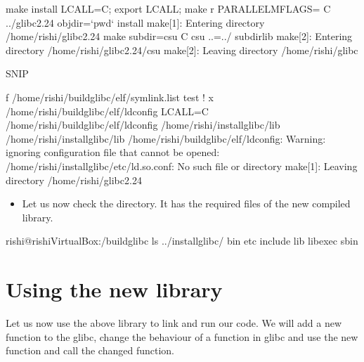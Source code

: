 \documentclass[letterpaper,10pt,english]{sphinxmanual}
\begin{document}
\begin{sphinxVerbatim}[commandchars=\\\{\}]
\PYGZdl{} make install
LC\PYGZus{}ALL=C; export LC\PYGZus{}ALL; \PYGZbs{}
make \PYGZhy{}r PARALLELMFLAGS=\PYGZdq{}\PYGZdq{} \PYGZhy{}C ../glibc\PYGZhy{}2.24 objdir={}`pwd{}` install
make[1]: Entering directory \PYGZsq{}/home/rishi/glibc\PYGZhy{}2.24\PYGZsq{}
make  subdir=csu \PYGZhy{}C csu ..=../ subdir\PYGZus{}lib
make[2]: Entering directory \PYGZsq{}/home/rishi/glibc\PYGZhy{}2.24/csu\PYGZsq{}
make[2]: Leaving directory \PYGZsq{}/home/rishi/glibc\PYGZhy{}

\PYGZgt{}\PYGZgt{}\PYGZgt{}\PYGZgt{}\PYGZgt{}\PYGZgt{}\PYGZgt{}\PYGZgt{}\PYGZgt{}\PYGZgt{}\PYGZgt{}SNIP\PYGZlt{}\PYGZlt{}\PYGZlt{}\PYGZlt{}\PYGZlt{}\PYGZlt{}\PYGZlt{}\PYGZlt{}\PYGZlt{}\PYGZlt{}\PYGZlt{}\PYGZlt{}\PYGZlt{}\PYGZlt{}\PYGZlt{}

 \PYGZhy{}f /home/rishi/build\PYGZus{}glibc/elf/symlink.list
 test ! \PYGZhy{}x /home/rishi/build\PYGZus{}glibc/elf/ldconfig \textbar{}\textbar{} LC\PYGZus{}ALL=C \PYGZbs{}
   /home/rishi/build\PYGZus{}glibc/elf/ldconfig  \PYGZbs{}
            /home/rishi/install\PYGZus{}glibc/lib /home/rishi/install\PYGZus{}glibc/lib
            /home/rishi/build\PYGZus{}glibc/elf/ldconfig: Warning: ignoring configuration file that cannot be opened: /home/rishi/install\PYGZus{}glibc/etc/ld.so.conf: No such file or directory
            make[1]: Leaving directory \PYGZsq{}/home/rishi/glibc\PYGZhy{}2.24\PYGZsq{}
\end{sphinxVerbatim}
\begin{itemize}
\item {} 
Let us now check the  directory. It has the required files of the new compiled library.

\end{itemize}

\begin{sphinxVerbatim}[commandchars=\\\{\}]
rishi@rishi\PYGZhy{}VirtualBox:\PYGZti{}/build\PYGZus{}glibc\PYGZdl{} ls ../install\PYGZus{}glibc/
bin  etc  include  lib  libexec  sbin
\end{sphinxVerbatim}


\section{Using the new library}
\label{\detokenize{03_glibc:using-the-new-library}}
Let us now use the above library to link and run our code. We will add a new
function to the glibc, change the behaviour of a function in glibc and use the
new function and call the changed function.
\end{document}
